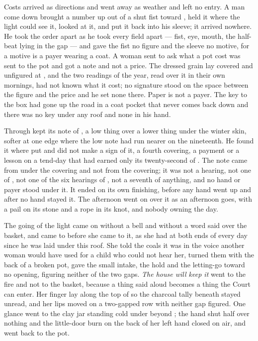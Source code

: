 Costs arrived as directions and went away as weather and left no entry. A man come down  brought a number up out of a shut fist toward , held it where the light could see it, looked at it, and put it back into his sleeve; it arrived nowhere. He took the order apart as he took every field apart --- fist, eye, mouth, the half-beat lying in the gap --- and gave the fist no figure and the sleeve no motive, for a motive is a payer wearing a coat. A woman sent to ask what a pot cost was sent to the pot and got a note and not a price. The dressed grain lay covered and unfigured at , and the two readings of the year, read over it in their own mornings, had not known what it cost; no signature stood on the space between the figure and the price and he set none there. Paper is not a payer. The key to the box had gone up the road in a coat pocket that never comes back down and there was no key under any roof and none in his hand.

Through   kept its note of , a low thing over a lower thing under the winter skin, softer at one edge where the low note had run nearer on the nineteenth. He found it where put and did not make a sign of it, a fourth covering, a payment or a lesson on a tend-day that had earned only its twenty-second of . The note came from under the covering and not from the covering; it was not a hearing, not one of , not one of the six hearings of , not a seventh of anything, and no hand or payer stood under it. It ended on its own finishing, before any hand went up and after no hand stayed it. The afternoon went on over it as an afternoon goes, with a pail on its stone and a rope in its knot, and nobody owning the day.

\scenebreak

The going of the light came on without a bell and without a word said over the basket, and  came to  before she came to it, as she had at both ends of every day since he was laid under this roof. She told the coals it was  in the voice another woman would have used for a child who could not hear her, turned them with the back of a broken pot, gave the small intake, the hold and the letting-go toward no opening, figuring neither of the two gaps. \emph{The house will keep it} went to the fire and not to the basket, because a thing said aloud becomes a thing the Court can enter. Her finger lay along the top of  so the charcoal tally beneath stayed unread, and her lips moved on a two-gapped row with neither gap figured. One glance went to the clay jar standing cold under  beyond ; the hand shut half over nothing and the little-door burn on the back of her left hand closed on air, and went back to the pot.

